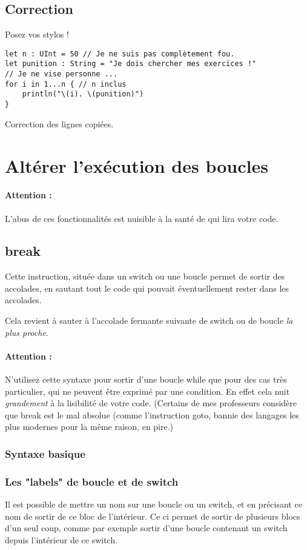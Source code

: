 \subsection{Correction}
Posez vos stylos !
\begin{listing}[h]
\begin{verbatim}
let n : UInt = 50 // Je ne suis pas complètement fou.
let punition : String = "Je dois chercher mes exercices !"
// Je ne vise personne ...
for i in 1...n { // n inclus
    println("\(i). \(punition)")
}
\end{verbatim}
\caption{Correction des lignes copiées.}
\end{listing}%
\section{Altérer l'exécution des boucles}
\paragraph{Attention :}
L'abus de ces fonctionnalités est nuisible à la santé de qui lira votre code.

\subsection{break}
Cette instruction, située dans un switch ou une boucle permet de sortir des accolades, en sautant tout le code qui pouvait éventuellement rester dans les accolades.

Cela revient à sauter à l'accolade fermante suivante de switch ou de boucle \emph{la plus proche}.
\paragraph{Attention :}N'utilisez cette syntaxe pour sortir d'une boucle while que pour des cas très particulier, qui ne peuvent être exprimé par une condition. En effet cela nuit \emph{grandement} à la lisibilité de votre code. (Certains de mes professeurs considère que break est le mal absolue (comme l'instruction goto, bannie des langages les plus modernes pour la même raison, en pire.)
\subsubsection{Syntaxe basique}

\subsubsection{Les "labels" de boucle et de switch}
Il est possible de mettre un nom sur une boucle ou un switch, et en précisant ce nom de sortir de ce bloc de l'intérieur. Ce ci permet de sortir de plusieurs blocs d'un seul coup, comme par exemple sortir d'une boucle contenant un switch depuis l'intérieur de ce switch.
